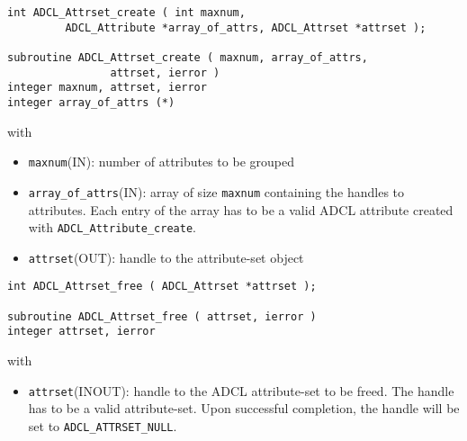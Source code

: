 \begin{verbatim}
int ADCL_Attrset_create ( int maxnum, 
         ADCL_Attribute *array_of_attrs, ADCL_Attrset *attrset );

subroutine ADCL_Attrset_create ( maxnum, array_of_attrs, 
                attrset, ierror )
integer maxnum, attrset, ierror
integer array_of_attrs (*)
\end{verbatim}
with
\begin{itemize}
\item {\tt maxnum}(IN): number of attributes to be grouped
\item {\tt array\_of\_attrs}(IN): array of size {\tt maxnum} containing the handles to attributes. Each entry of the array has to be a valid ADCL attribute created with {\tt ADCL\_Attribute\_create}.
\item {\tt attrset}(OUT): handle to the attribute-set object
\end{itemize}
\hspace{1cm}
\begin{verbatim}
int ADCL_Attrset_free ( ADCL_Attrset *attrset );

subroutine ADCL_Attrset_free ( attrset, ierror )
integer attrset, ierror
\end{verbatim}
with
\begin{itemize}
\item {\tt attrset}(INOUT): handle to the ADCL attribute-set to be freed. The handle has to be a valid attribute-set.
    	Upon successful completion, the handle will be set to {\tt ADCL\_ATTRSET\_NULL}.
\end{itemize}
